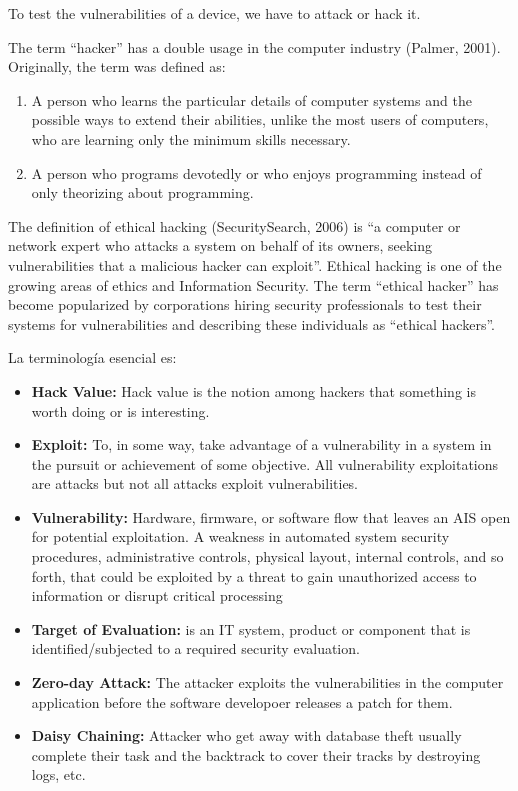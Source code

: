 
To test the vulnerabilities of a device, we have to attack or hack it.

The term ``hacker'' has a double usage in the computer industry (Palmer, 2001). Originally, the term was defined as:  
\begin{enumerate}
	\item A person who learns the particular details of computer systems and the possible ways to extend their abilities, unlike  the  most  users  of  computers,  who  are  learning  only the minimum skills necessary.  
	\item A person who programs devotedly or who enjoys programming instead of only theorizing about programming.
\end{enumerate}

The definition of ethical hacking (SecuritySearch, 2006) is  ``a computer or network expert who attacks a system on behalf of its owners, seeking vulnerabilities that a malicious hacker can exploit''. Ethical hacking is one of the growing areas of ethics and Information Security. The term ``ethical hacker'' has become popularized by corporations hiring security professionals to test their systems for vulnerabilities and describing these individuals as ``ethical hackers''.\cite{ethicalHacking}

La terminología esencial es:

\begin{itemize}
	\item \textbf{Hack Value:} Hack value is the notion among hackers that something is worth doing or is interesting.
	\item \textbf{Exploit:} To, in some way, take advantage of a vulnerability in a system in the pursuit or achievement of some objective. All vulnerability exploitations are attacks but not all attacks exploit vulnerabilities.\cite{Hacking1}
	\item \textbf{Vulnerability:} Hardware, firmware, or software flow that leaves an AIS open for potential exploitation. A weakness in automated system security procedures, administrative controls, physical layout, internal controls, and so forth, that could be exploited by a threat to gain unauthorized access to information or disrupt critical processing
	\item \textbf{Target of Evaluation:} is an IT system, product or component that is identified/subjected to a required security evaluation.
	\item \textbf{Zero-day Attack:} The attacker exploits the vulnerabilities in the computer application before the software developoer releases a patch for them.
	\item \textbf{Daisy Chaining:} Attacker who get away with database theft usually complete their task and the backtrack to cover their tracks by destroying logs, etc.
\end{itemize}

